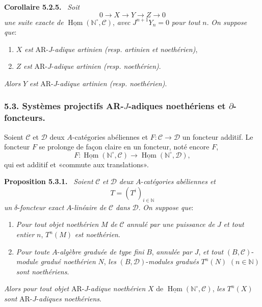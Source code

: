 \documentclass[11pt]{article}
\newenvironment{statement}[1]{\par\medskip\noindent\textbf{#1.}\ }{\par\medskip}
\DeclareMathOperator{\Hom}{Hom}
\providecommand{\uHom}{\underline{\Hom}}
\providecommand{\Hom}{\operatorname{Hom}}
\providecommand{\Hom}{\operatorname{Hom}}
\begin{document}
\begin{statement}{Corollaire 5.2.5}
\emph{Soit}
\[
0\longrightarrow X\longrightarrow Y\longrightarrow Z\longrightarrow0
\]
\emph{une suite exacte de} \(\uHom(\mathbb N^\circ,\mathcal C)\), \emph{avec} \(J^{n+1}Y_n=0\) \emph{pour tout} \(n\). \emph{On suppose que}:
\begin{enumerate}[label=\textup{(\roman*)}]
\item \(X\) \emph{est} AR-\(J\)-\emph{adique artinien (resp. artinien et noethérien)},
\item \(Z\) \emph{est} AR-\(J\)-\emph{adique artinien (resp. noethérien)}.
\end{enumerate}
\emph{Alors} \(Y\) \emph{est} AR-\(J\)-\emph{adique artinien (resp. noethérien)}.
\end{statement}

\subsubsection*{5.3. Systèmes projectifs AR-\(J\)-adiques noethériens et \(\partial\)-foncteurs.}

Soient \(\mathcal C\) et \(\mathcal D\) deux \(A\)-catégories abéliennes et \(F:\mathcal C\to\mathcal D\) un foncteur additif. Le foncteur \(F\) se prolonge de façon claire en un foncteur, noté encore \(F\),
\[
F:\uHom(\mathbb N^\circ,\mathcal C)\longrightarrow\uHom(\mathbb N^\circ,\mathcal D),
\]
qui est additif et «commute aux translations».

\begin{statement}{Proposition 5.3.1}
\emph{Soient} \(\mathcal C\) \emph{et} \(\mathcal D\) \emph{deux} \(A\)-\emph{catégories abéliennes et}
\[
T=(T^i)_{i\in\mathbb N}
\]
\emph{un} \(\delta\)-\emph{foncteur exact} \(A\)-\emph{linéaire de} \(\mathcal C\) \emph{dans} \(\mathcal D\). \emph{On suppose que}:
\begin{enumerate}[label=\textup{(\roman*)}]
\item \emph{Pour tout objet noethérien} \(M\) \emph{de} \(\mathcal C\) \emph{annulé par une puissance de} \(J\) \emph{et tout entier} \(n\), \(T^n(M)\) \emph{est noethérien}.
\item \emph{Pour toute} \(A\)-\emph{algèbre graduée de type fini} \(B\), \emph{annulée par} \(J\), \emph{et tout} \((B,\mathcal C)\)-\emph{module gradué noethérien} \(N\), \emph{les} \((B,\mathcal D)\)-\emph{modules gradués} \(T^n(N)\) \((n\in\mathbb N)\) \emph{sont noethériens}.
\end{enumerate}
\emph{Alors pour tout objet} AR-\(J\)-\emph{adique noethérien} \(X\) de \(\uHom(\mathbb N^\circ,\mathcal C)\), \emph{les} \(T^n(X)\) \emph{sont} AR-\(J\)-\emph{adiques noethériens}.
\end{statement}
\end{document}
